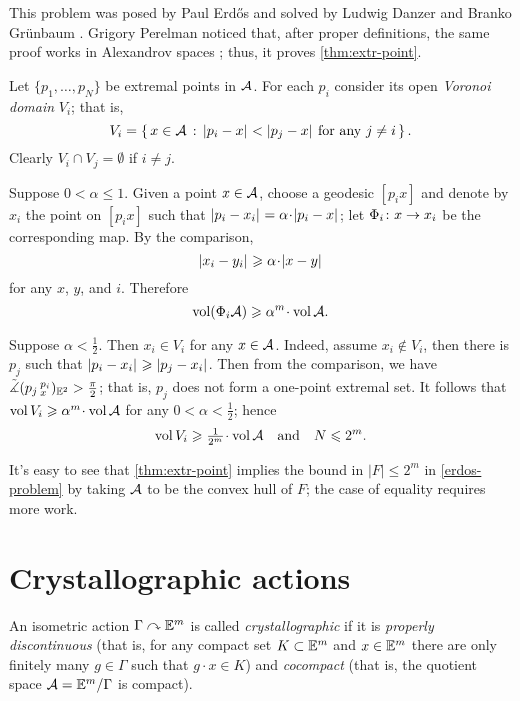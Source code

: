 This problem was posed by Paul Erdős \cite{erdos} and solved by Ludwig Danzer and Branko Gr\"unbaum \cite{danzer-gruenbaum}.
Grigory Perelman noticed that, after proper definitions, the same proof works in Alexandrov spaces \cite{perelman-Erdos}; thus, it proves \ref{thm:extr-point}.

Let $\{p_1,\dots,p_N\}$ be extremal points in $\mathcal{A}$.
For each $p_i$ consider its open \emph{Voronoi domain} $V_i$; that is, 
\[V_i=\set{x\in \spc{A}}{\dist{p_i}{x}{}<\dist{p_j}{x}{}\ \text{for any}\ j\not=i}.\]
Clearly $V_i\cap V_j=\emptyset$ if $i\not=j$.

Suppose  $0<\alpha\le 1$.
Given a point $x\in\mathcal{A}$, choose a geodesic $[p_ix]$ and denote by $x_i$ the point on $[p_ix]$ such that $\dist{p_i}{x_i}{}=\alpha\cdot\dist{p_i}{x}{}$;
let $\Phi_i\colon x\to x_i$ be the corresponding map.
By the comparison, 
\[\dist{x_i}{y_i}{}\ge\alpha\cdot \dist{x}{y}{}\]
for any $x$, $y$, and $i$.
Therefore 
\[\vol(\map_i \spc{A})\ge\alpha^m\cdot\vol \spc{A}.\]

Suppose $\alpha<\tfrac12$.
Then $x_i\in V_i$ for any $x\in \mathcal{A}$.
Indeed, assume $x_i\notin V_i$,
then there is $p_j$ such that $|{p_i}-{x_i}|_{}^{{}}\geqslant|{p_j}-{x_i}|_{}^{{}}$.
Then from the comparison, we have $\tilde\measuredangle(p_j\,{}^{p_i}_{x})_{\mathbb{E}^2}>\tfrac\pi2$;
that is, $p_j$ does not form a one-point extremal set.
It follows that $\vol V_i\ge\alpha^m\cdot\vol \spc{A}$
for any $0<\alpha<\tfrac12$; hence 
\[\vol V_i\ge\tfrac1{2^m}\cdot\vol \spc{A}\quad\text{and}\quad N\le 2^m.\]
\qedsf

It's easy to see that \ref{thm:extr-point} implies the bound in $|F|\le 2^m$ in \ref{erdos-problem} by taking $\mathcal{A}$ to be the convex hull of $F$;
the case of equality requires more work.

\section{Crystallographic actions}

An isometric action $\Gamma\curvearrowright \mathbb{E}^m$ is called \emph{crystallographic} if it is 
\emph{properly discontinuous} (that is, for any compact set $K\subset \mathbb{E}^m$ and $x\in \mathbb{E}^m$ there are only finitely many $g\in \Gamma$ such that $g\cdot x\in K$) and \emph{cocompact} (that is, the quotient space $\mathcal{A}=\mathbb{E}^m/\Gamma$ is compact).

